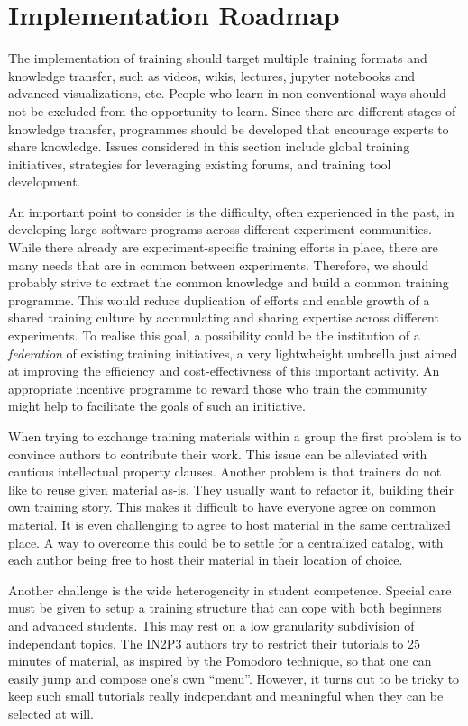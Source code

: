 \documentclass[12pt,a4paper]{article}
\begin{document}
\section{Implementation Roadmap}
The implementation of training should target multiple training formats and
knowledge transfer, such as videos, wikis, lectures, jupyter notebooks and
advanced visualizations, etc.
People who learn in non-conventional ways should not be excluded from the
opportunity to learn. 
Since there are different stages of knowledge transfer,
programmes should be developed that encourage experts to share knowledge. Issues
considered in this section include global training initiatives, strategies for
leveraging existing forums, and training tool development.

An important point to consider is the difficulty, often experienced in the past,
in developing large software programs across different experiment communities.
While there already are experiment-specific training efforts in place, there are
many needs that are in common between experiments. Therefore, we should probably
strive to extract the common knowledge and build a common training programme. This
would reduce duplication of efforts and enable growth of a shared training
culture by accumulating and sharing expertise across different experiments.
To realise this goal, a possibility could be the institution of a {\em
federation} of existing training initiatives, a very lightwheight umbrella just
aimed at improving the efficiency and cost-effectivness of this important
activity. An appropriate incentive programme to reward those who train the community 
might help to facilitate the goals of such an initiative.

When trying to exchange training materials within a group the first problem is
to convince authors to contribute their work. This issue
can be alleviated with cautious intellectual property clauses. Another
problem is that trainers do not like to reuse given material as-is. They usually
want to refactor it, building their own training story.
This makes it difficult to have everyone agree on common material.
It is even challenging to agree to host material in the same
centralized place. A way to overcome this could be to settle for a centralized
catalog, with each author being free to host their material in their location
of choice.

Another challenge is the wide heterogeneity in
student competence. Special care must be given to setup
a training structure that can cope with both beginners and advanced students.
This may rest on a low granularity subdivision of independant topics.
The IN2P3 authors try to restrict their tutorials to 25 minutes
of material, as inspired by the Pomodoro technique\cite{PomodoroTechnique}, so
that one can easily jump and compose one's own ``menu''. However, it turns out to be tricky to keep such
small tutorials really independant and meaningful when they can be selected at
will.
\end{document}
